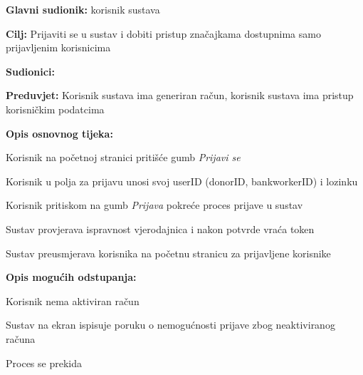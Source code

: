 					\noindent {}
					\begin{packed_item}  \label{UC3.1}
	
						\item \textbf{Glavni sudionik: }korisnik sustava
						\item  \textbf{Cilj:} Prijaviti se u sustav i dobiti pristup značajkama dostupnima samo prijavljenim korisnicima
						\item  \textbf{Sudionici:} 
						\item  \textbf{Preduvjet:} Korisnik sustava ima generiran račun, korisnik sustava ima pristup korisničkim podatcima
						\item  \textbf{Opis osnovnog tijeka:}
						
						\item[] \begin{packed_enum}
	                        \item Korisnik na početnoj stranici pritišće gumb \textit{Prijavi se}
	                        \item Korisnik u polja za prijavu unosi svoj userID (donorID, bankworkerID) i lozinku
	                        \item Korisnik pritiskom na gumb \textit{Prijava} pokreće proces prijave u sustav
	                        \item Sustav provjerava ispravnost vjerodajnica i nakon potvrde vraća token
	                        \item Sustav preusmjerava korisnika na početnu stranicu za prijavljene korisnike
						\end{packed_enum}
						
						\item  \textbf{Opis mogućih odstupanja:}
						\item[] \begin{packed_enum}
						
	                        \item[3.a] Korisnik nema aktiviran račun
	                        \item[] \begin{packed_enum}
    	                        \item Sustav na ekran ispisuje poruku o nemogućnosti prijave zbog neaktiviranog računa
    	                        \item Proces se prekida
					    	\end{packed_enum}
					    	

\end{packed_enum}
\end{packed_item}
